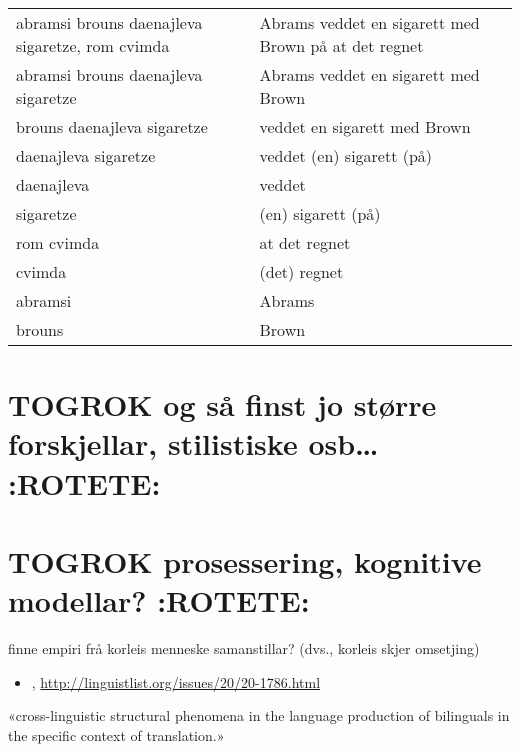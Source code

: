 \documentclass[11pt,a4paper,oneside,draft]{book}
\begin{document}
\begin{center}
\begin{tabular}{ll}
 abramsi brouns daenajleva sigaretze, rom cvimda  &  Abrams veddet en sigarett med Brown på at det regnet  \\
 abramsi brouns daenajleva sigaretze              &  Abrams veddet en sigarett med Brown                   \\
 brouns daenajleva sigaretze                      &  veddet en sigarett med Brown                          \\
 daenajleva sigaretze                             &  veddet (en) sigarett (på)                             \\
 daenajleva                                       &  veddet                                                \\
 sigaretze                                        &  (en) sigarett (på)                                    \\
 rom cvimda                                       &  at det regnet                                         \\
 cvimda                                           &  (det) regnet                                          \\
 abramsi                                          &  Abrams                                                \\
 brouns                                           &  Brown                                                 \\
\end{tabular}
\end{center}


 
\section{\textbf{TOGROK} og så finst jo større forskjellar, stilistiske osb\ldots{} \textbf{:ROTETE:}}
\label{sec-3.22}


\section{\textbf{TOGROK} prosessering, kognitive modellar? \textbf{:ROTETE:}}
\label{sec-3.23}

finne empiri frå korleis menneske samanstillar? (dvs., korleis skjer
omsetjing)

\begin{itemize}
\item \citet{maier2009sis}, \href{http://linguistlist.org/issues/20/20-1786.html}{http://linguistlist.org/issues/20/20-1786.html}
\end{itemize}
«cross-linguistic structural phenomena in the language production of
bilinguals in the specific context of translation.»
\end{document}
